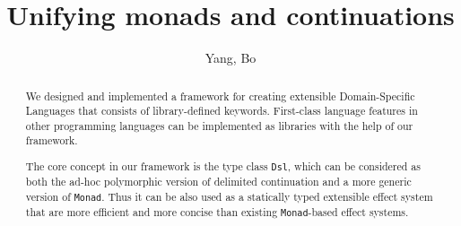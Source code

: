 \documentclass[acmsmall,10pt,review,screen,anonymous]{acmart}
\begin{document}
\title{Unifying monads and continuations}

\author{Yang, Bo}


\begin{abstract}
We designed and implemented a framework for creating extensible Domain-Specific Languages that consists of library-defined keywords.
First-class language features in other programming languages can be implemented as libraries with the help of our framework.

The core concept in our framework is the type class \texttt{Dsl}, which can be considered as both the ad-hoc polymorphic version of delimited continuation and a more generic version of \texttt{Monad}. Thus it can be also used as a statically typed extensible effect system that are more efficient and more concise than existing \texttt{Monad}-based effect systems.
\end{abstract}
\end{document}
